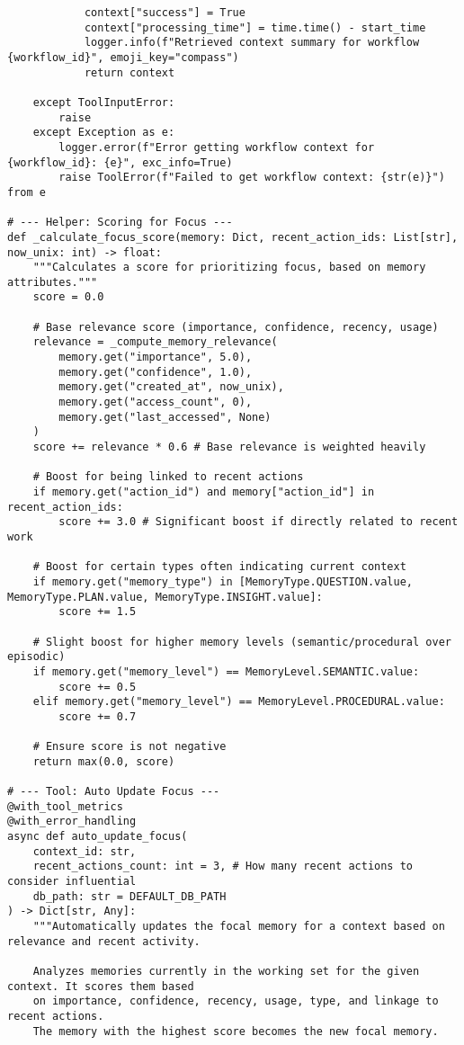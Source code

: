 \documentclass[12pt,a4paper]{article}
\begin{document}
\begin{pageablecode}
\begin{verbatim}
            context["success"] = True
            context["processing_time"] = time.time() - start_time
            logger.info(f"Retrieved context summary for workflow {workflow_id}", emoji_key="compass")
            return context

    except ToolInputError:
        raise
    except Exception as e:
        logger.error(f"Error getting workflow context for {workflow_id}: {e}", exc_info=True)
        raise ToolError(f"Failed to get workflow context: {str(e)}") from e

# --- Helper: Scoring for Focus ---
def _calculate_focus_score(memory: Dict, recent_action_ids: List[str], now_unix: int) -> float:
    """Calculates a score for prioritizing focus, based on memory attributes."""
    score = 0.0

    # Base relevance score (importance, confidence, recency, usage)
    relevance = _compute_memory_relevance(
        memory.get("importance", 5.0),
        memory.get("confidence", 1.0),
        memory.get("created_at", now_unix),
        memory.get("access_count", 0),
        memory.get("last_accessed", None)
    )
    score += relevance * 0.6 # Base relevance is weighted heavily

    # Boost for being linked to recent actions
    if memory.get("action_id") and memory["action_id"] in recent_action_ids:
        score += 3.0 # Significant boost if directly related to recent work

    # Boost for certain types often indicating current context
    if memory.get("memory_type") in [MemoryType.QUESTION.value, MemoryType.PLAN.value, MemoryType.INSIGHT.value]:
        score += 1.5

    # Slight boost for higher memory levels (semantic/procedural over episodic)
    if memory.get("memory_level") == MemoryLevel.SEMANTIC.value:
        score += 0.5
    elif memory.get("memory_level") == MemoryLevel.PROCEDURAL.value:
        score += 0.7

    # Ensure score is not negative
    return max(0.0, score)

# --- Tool: Auto Update Focus ---
@with_tool_metrics
@with_error_handling
async def auto_update_focus(
    context_id: str,
    recent_actions_count: int = 3, # How many recent actions to consider influential
    db_path: str = DEFAULT_DB_PATH
) -> Dict[str, Any]:
    """Automatically updates the focal memory for a context based on relevance and recent activity.

    Analyzes memories currently in the working set for the given context. It scores them based
    on importance, confidence, recency, usage, type, and linkage to recent actions.
    The memory with the highest score becomes the new focal memory.


\end{verbatim}
\end{pageablecode}
\end{document}
